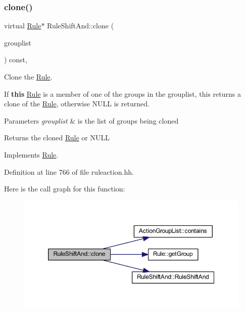\subsubsection{\texorpdfstring{clone()}{clone()}}
{\footnotesize\ttfamily virtual \mbox{\hyperlink{class_rule}{Rule}}$\ast$ Rule\+Shift\+And\+::clone (\begin{DoxyParamCaption}\item[{const \mbox{\hyperlink{class_action_group_list}{Action\+Group\+List}} \&}]{grouplist }\end{DoxyParamCaption}) const\hspace{0.3cm}{\ttfamily [inline]}, {\ttfamily [virtual]}}



Clone the \mbox{\hyperlink{class_rule}{Rule}}. 

If {\bfseries{this}} \mbox{\hyperlink{class_rule}{Rule}} is a member of one of the groups in the grouplist, this returns a clone of the \mbox{\hyperlink{class_rule}{Rule}}, otherwise N\+U\+LL is returned. 
\begin{DoxyParams}{Parameters}
{\em grouplist} & is the list of groups being cloned \\
\hline
\end{DoxyParams}
\begin{DoxyReturn}{Returns}
the cloned \mbox{\hyperlink{class_rule}{Rule}} or N\+U\+LL 
\end{DoxyReturn}


Implements \mbox{\hyperlink{class_rule_a70de90a76461bfa7ea0b575ce3c11e4d}{Rule}}.



Definition at line 766 of file ruleaction.\+hh.

Here is the call graph for this function\+:
\nopagebreak
\begin{figure}[H]
\begin{center}
\leavevmode
\includegraphics[width=350pt]{class_rule_shift_and_a3afbafd2204add57aded444eea904f56_cgraph}
\end{center}
\end{figure}
\mbox{\label{class_rule_shift_and_ae41a87fb89b843d28c1e953aa28376c1}} 
